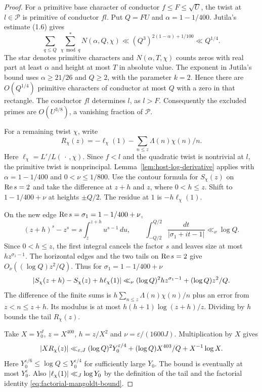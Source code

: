 \begin{proof}

For a primitive base character of conductor \(f\le F\le\sqrt U\),
the twist at \(l\in\mathcal P\) is primitive of conductor \(fl\).
Put \(Q=FU\) and \(\alpha=1-1/400\). Jutila's estimate (1.6) gives
\[
 \sum_{q\le Q}\ \sum_{\chi\bmod q}^{*}N(\alpha,Q,\chi)
     \ll (Q^3)^{2(1-\alpha)+1/100}\ll Q^{1/4} .
\]
The star denotes primitive characters and \(N(\alpha,T,\chi)\)
counts zeros with real part at least \(\alpha\) and height at most
\(T\) in absolute value. The exponent in Jutila's bound uses
\(\alpha\ge21/26\) and \(Q\ge2\), with the parameter \(k=2\).
Hence there are \(O(Q^{1/4})\) primitive characters of conductor
at most \(Q\) with a zero in that rectangle. The conductor \(fl\)
determines \(l\), as \(l>F\). Consequently the excluded primes
are \(O(U^{3/8})\), a vanishing fraction of \(\mathcal P\).
\hfill\mbox{\cite{jutila}}


For a remaining twist \(\chi\), write
\[
  R_\chi(z)=-\ell_\chi(1)-\sum_{n\le z}\Lambda(n)\chi(n)/n .
\]
Here \(\ell_\chi=L'/L(\,\cdot\,,\chi)\). Since \(f<l\) and the
quadratic twist is nontrivial at \(l\), the primitive twist is
nonprincipal. Lemma~\ref{lem:host-log-derivative} applies with
\(\alpha=1-1/400\) and \(0<\nu\le1/800\). Use the contour formula for \(S_\chi(z)\) on
\(\operatorname{Re} s=2\) and take the difference at \(z+h\) and \(z\),
where \(0<h\le z\). Shift to \(1-1/400+\nu\) at heights
\(\pm Q/2\). The residue at \(1\) is \(-h\ell_\chi(1)\).

On the new edge \(\operatorname{Re} s=\sigma_1=1-1/400+\nu\),
\[
 (z+h)^s-z^s=s\int_z^{z+h}u^{s-1}\,du,\qquad
 \int_{-Q/2}^{Q/2}\frac{dt}{|\sigma_1+it-1|}
      \ll_\nu\log Q .
\]
Since \(0<h\le z\), the first integral cancels the factor
\(s\) and leaves size at most \(h z^{\sigma_1-1}\).
The horizontal edges and the two tails on \(\operatorname{Re} s=2\)
give \(O_\nu((\log Q) z^2/Q)\). Thus for
\(\sigma_1=1-1/400+\nu\)
\[
 \lvert S_\chi(z+h)-S_\chi(z)+h\ell_\chi(1)\rvert
 \ll_\nu (\log Q)^2 h z^{\sigma_1-1}
                       +(\log Q) z^2/Q .
\]
The difference of the finite sums is
\(h\sum_{n\le z}\Lambda(n)\chi(n)/n\) plus an error from
\(z<n\le z+h\). Its modulus is at most
\(h(h+1)\log(z+h)/z\). Dividing by \(h\) bounds the tail \(R_\chi(z)\).


Take \(X=Y_0^J\), \(z=X^{400}\), \(h=z/X^2\) and
\(\nu=\varepsilon/(1600J)\). Multiplication by \(X\) gives
\[
 \lvert X R_\chi(z)\rvert
 \ll_{\varepsilon,J}(\log Q)^2Y_0^{\varepsilon/4}
      +(\log Q)X^{403}/Q+ X^{-1}\log X .
\]
Here \(Y_0^{\varepsilon/6}\le\log Q\le Y_0^{\varepsilon/4}\)
for sufficiently large \(Y_0\). The bound is eventually at most
\(Y_0^\varepsilon\). Also
\(\lvert\ell_\chi(1)\rvert\ll_J\log Y_0\) by the definition of the
tail and the factorial identity \eqref{eq:factorial-mangoldt-bound}.


\end{proof}
